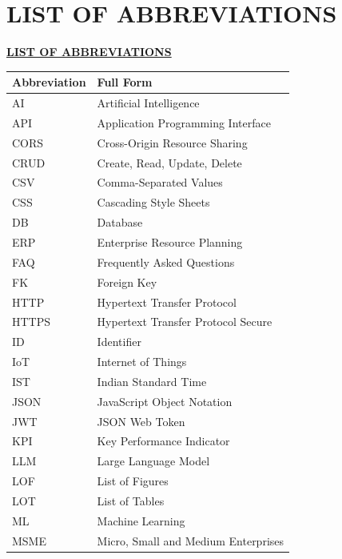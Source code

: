 \chapter*{LIST OF ABBREVIATIONS}
{\centering\fontsize{14}{18}\bfseries\underline{LIST OF ABBREVIATIONS}\par}
\vspace{0.8cm}

{\singlespacing
\begin{longtable}{@{}p{} p{}@{}}
\toprule
\textbf{Abbreviation} & \textbf{Full Form} \\
\midrule
\endhead
AI      & Artificial Intelligence \\
API     & Application Programming Interface \\
CORS    & Cross-Origin Resource Sharing \\
CRUD    & Create, Read, Update, Delete \\
CSV     & Comma-Separated Values \\
CSS     & Cascading Style Sheets \\
DB      & Database \\
ERP     & Enterprise Resource Planning \\
FAQ     & Frequently Asked Questions \\
FK      & Foreign Key \\
HTTP    & Hypertext Transfer Protocol \\
HTTPS   & Hypertext Transfer Protocol Secure \\
ID      & Identifier \\
IoT     & Internet of Things \\
IST     & Indian Standard Time \\
JSON    & JavaScript Object Notation \\
JWT     & JSON Web Token \\
KPI     & Key Performance Indicator \\
LLM     & Large Language Model \\
LOF     & List of Figures \\
LOT     & List of Tables \\
ML      & Machine Learning \\
MSME    & Micro, Small and Medium Enterprises \\

\end{longtable}}
